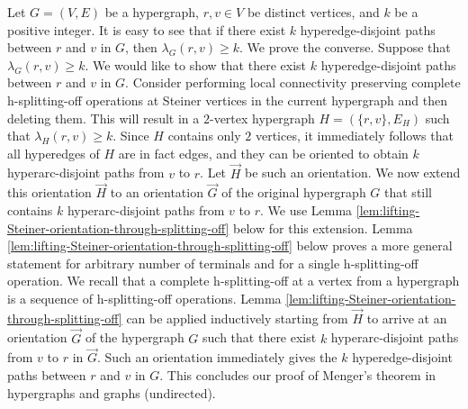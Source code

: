 Let $G=(V, E)$ be a hypergraph, $r,v\in V$ be distinct vertices, and $k$ be a positive integer. It is easy to see that if there exist $k$ hyperedge-disjoint paths between $r$ and $v$ in $G$, then $\lambda_G(r,v)\ge k$. We prove the converse. Suppose that $\lambda_G(r, v)\ge k$. We would like to show that there exist $k$ hyperedge-disjoint paths between $r$ and $v$ in $G$. 
Consider performing local connectivity preserving complete h-splitting-off operations at Steiner vertices in the current hypergraph and then deleting them. This will result in a $2$-vertex hypergraph $H=(\{r,v\}, E_H)$ such that $\lambda_H(r,v)\ge k$. Since $H$ contains only $2$ vertices, it immediately follows that all hyperedges of $H$ are in fact edges, and they can be oriented to obtain $k$ hyperarc-disjoint paths 
from $v$ to $r$. 
Let $\overrightarrow{H}$ be such an orientation. 
We now extend this orientation $\overrightarrow{H}$ to an orientation $\overrightarrow{G}$ of the original hypergraph $G$ that still contains $k$ hyperarc-disjoint paths 
from $v$ to $r$. 
We use Lemma \ref{lem:lifting-Steiner-orientation-through-splitting-off} below for this extension. 
Lemma \ref{lem:lifting-Steiner-orientation-through-splitting-off} below proves a more general statement for arbitrary number of terminals and for a single h-splitting-off operation. We recall that a complete h-splitting-off at a vertex from a hypergraph is a sequence of h-splitting-off operations. 
Lemma \ref{lem:lifting-Steiner-orientation-through-splitting-off} can be applied inductively starting from $\overrightarrow{H}$ to arrive at an orientation $\overrightarrow{G}$ of the hypergraph $G$ such that there exist $k$ hyperarc-disjoint paths 
from $v$ to $r$ 
in $\overrightarrow{G}$. Such an orientation immediately gives the $k$ hyperedge-disjoint paths between $r$ and $v$ in $G$. This concludes our proof of Menger's theorem in hypergraphs and graphs (undirected). 


